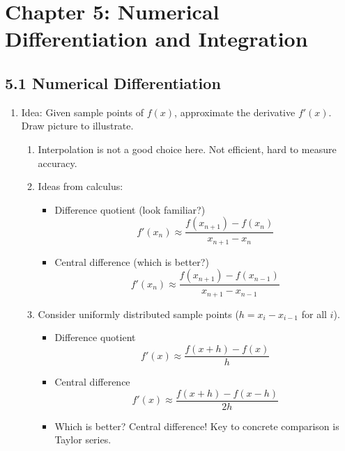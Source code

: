 \documentclass{article}
\theoremstyle{remark}
\begin{document}
\section{Chapter 5: Numerical Differentiation and Integration}

\subsection{5.1 Numerical Differentiation}

\begin{enumerate}
\item Idea: Given sample points of $f(x)$, approximate the derivative $f'(x)$. Draw picture to illustrate.
\begin{enumerate}
\item Interpolation is not a good choice here. Not efficient, hard to measure accuracy. 
\item Ideas from calculus:
\begin{itemize}
\item Difference quotient (look familiar?)
$$
f'(x_n) \approx \frac{f(x_{n+1})-f(x_n)}{x_{n+1}-x_n}
$$
\item Central difference (which is better?)
$$
f'(x_n) \approx \frac{f(x_{n+1})-f(x_{n-1})}{x_{n+1}-x_{n-1}}
$$
\end{itemize}
\item Consider uniformly distributed sample points ($h=x_i - x_{i-1}$ for all $i$).
\begin{itemize}
\item Difference quotient
$$
f'(x) \approx \frac{f(x+h)-f(x)}{h}
$$
\item Central difference
$$
f'(x) \approx \frac{f(x+h)-f(x-h)}{2h}
$$
\item Which is better? Central difference! Key to concrete comparison is Taylor series. 
\end{itemize}
\end{enumerate}



\end{enumerate}
\end{document}
